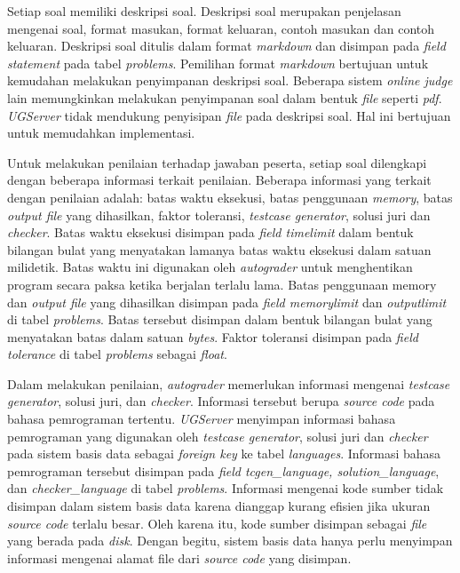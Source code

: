 \par Setiap soal memiliki deskripsi soal. Deskripsi soal merupakan penjelasan mengenai soal, format masukan, format keluaran, contoh masukan dan contoh keluaran. Deskripsi soal ditulis dalam format \textit{markdown} dan disimpan pada \textit{field} \textit{statement} pada tabel \textit{problems}. Pemilihan format \textit{markdown} bertujuan untuk kemudahan melakukan penyimpanan deskripsi soal. Beberapa sistem \textit{online judge} lain memungkinkan melakukan penyimpanan soal dalam bentuk \textit{file} seperti \textit{pdf}. \textit{UGServer} tidak mendukung penyisipan \textit{file} pada deskripsi soal. Hal ini bertujuan untuk memudahkan implementasi.

\par Untuk melakukan penilaian terhadap jawaban peserta, setiap soal dilengkapi dengan beberapa informasi terkait penilaian. Beberapa informasi yang terkait dengan penilaian adalah: batas waktu eksekusi, batas penggunaan \textit{memory}, batas \textit{output file} yang dihasilkan, faktor toleransi, \textit{testcase generator}, solusi juri dan \textit{checker}. Batas waktu eksekusi disimpan pada \textit{field timelimit} dalam bentuk bilangan bulat yang menyatakan lamanya batas waktu eksekusi dalam satuan milidetik. Batas waktu ini digunakan oleh \textit{autograder} untuk menghentikan program secara paksa ketika berjalan terlalu lama. Batas penggunaan memory dan \textit{output file} yang dihasilkan disimpan pada \textit{field memorylimit} dan \textit{outputlimit} di tabel \textit{problems}. Batas tersebut disimpan dalam bentuk bilangan bulat yang menyatakan batas dalam satuan \textit{bytes}. Faktor toleransi disimpan pada \textit{field tolerance} di tabel \textit{problems} sebagai \textit{float}.

\par Dalam melakukan penilaian, \textit{autograder} memerlukan informasi mengenai \textit{testcase generator}, solusi juri, dan \textit{checker}. Informasi tersebut berupa \textit{source code} pada bahasa pemrograman tertentu. \textit{UGServer} menyimpan informasi bahasa pemrograman yang digunakan oleh \textit{testcase generator}, solusi juri dan \textit{checker} pada sistem basis data sebagai \textit{foreign key} ke tabel \textit{languages}. Informasi bahasa pemrograman tersebut disimpan pada \textit{field tcgen\_language, solution\_language}, dan \textit{checker\_language} di tabel \textit{problems}. Informasi mengenai kode sumber tidak disimpan dalam sistem basis data karena dianggap kurang efisien jika ukuran \textit{source code} terlalu besar. Oleh karena itu, kode sumber disimpan sebagai \textit{file} yang berada pada \textit{disk}. Dengan begitu, sistem basis data hanya perlu menyimpan informasi mengenai alamat file dari \textit{source code} yang disimpan.

